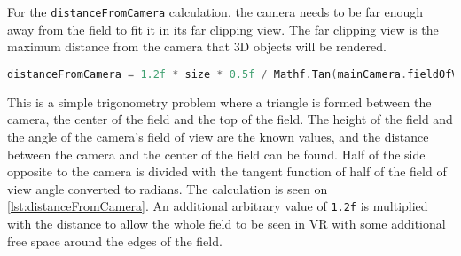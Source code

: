 For the \texttt{distanceFromCamera} calculation, the camera needs to be far enough away from the field to fit it in its far clipping view.
The far clipping view is the maximum distance from the camera that 3D objects will be rendered.
\begin{lstlisting}[caption={Calculation of the distance between the camera and field}, captionpos=b,language=C,label={lst:distanceFromCamera}]
    distanceFromCamera = 1.2f * size * 0.5f / Mathf.Tan(mainCamera.fieldOfView * 0.5f * Mathf.Deg2Rad);
\end{lstlisting}
This is a simple trigonometry problem where a triangle is formed between the camera, the center of the field and the top of the field.
The height of the field and the angle of the camera's field of view are the known values, and the distance between the camera and the center of the field can be found. 
Half of the side opposite to the camera is divided with the tangent function of half of the field of view angle converted to radians.
The calculation is seen on \autoref{lst:distanceFromCamera}.
An additional arbitrary value of \texttt{1.2f} is multiplied with the distance to allow the whole field to be seen in VR with some additional free space around the edges of the field.
